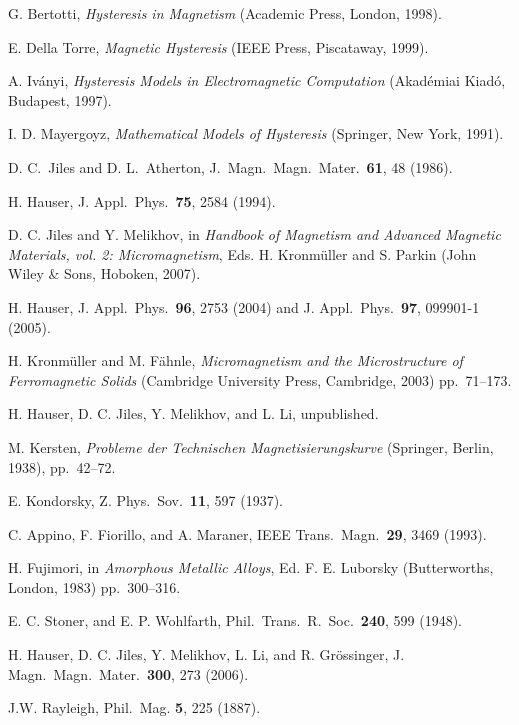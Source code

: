 \documentclass[12pt,fleqn]{article}
\begin{document}











\begin{thebibliography}{99}

G. Bertotti, {\em Hysteresis in Magnetism} (Academic Press, London, 1998).

E. Della Torre, {\em Magnetic Hysteresis} (IEEE Press, Piscataway, 1999).

A. Iv\'anyi, {\em Hysteresis Models in Electromagnetic Computation}
(Akad\'emiai Kiad\'o, Budapest, 1997).

I. D. Mayergoyz, {\em Mathematical Models of Hysteresis} (Springer, New York,
1991).

D. C.\ Jiles and D. L.\ Atherton,
J.\ Magn.\ Magn.\ Mater.\ {\bf 61}, 48 (1986).

H. Hauser,
J. Appl.\ Phys.\ {\bf 75}, 2584 (1994).

D. C. Jiles and Y. Melikhov,
in {\em Handbook of Magnetism and Advanced Magnetic Materials, vol. 2: Micromagnetism},
Eds. H. Kronm\"uller and S. Parkin (John Wiley \& Sons, Hoboken, 2007).

H. Hauser,
J. Appl.\ Phys.\ {\bf 96}, 2753 (2004) and
J. Appl.\ Phys.\ {\bf 97}, 099901-1 (2005).

H. Kronm\"uller and M. F\"ahnle, {\em Micromagnetism and the Microstructure of
Ferromagnetic Solids} (Cambridge University Press, Cambridge, 2003) pp.~71--173.

H. Hauser, D. C. Jiles, Y. Melikhov, and L. Li,
unpublished.


M. Kersten, {\em Probleme der Technischen Magnetisierungskurve} (Springer,
Berlin, 1938), pp.\ 42--72.

E. Kondorsky, Z. Phys.\ Sov.\ {\bf 11}, 597 (1937).

C. Appino, F. Fiorillo, and A. Maraner,
IEEE Trans.\ Magn.\ {\bf 29}, 3469 (1993).

H. Fujimori, in {\em Amorphous Metallic Alloys}, Ed. F. E. Luborsky
(Butterworths, London, 1983) pp.~300--316.

E. C. Stoner, and E. P. Wohlfarth, 
Phil.\ Trans.\ R.\ Soc.\  {\bf 240}, 599%
(1948).

H. Hauser, D. C. Jiles, Y. Melikhov, L. Li, and R. Gr\"ossinger,
J. Magn.\ Magn.\ Mater.\ {\bf 300}, 273 (2006).

J.W. Rayleigh,
Phil.\ Mag. {\bf 5}, 225 (1887).

\end{thebibliography}
\end{document}
